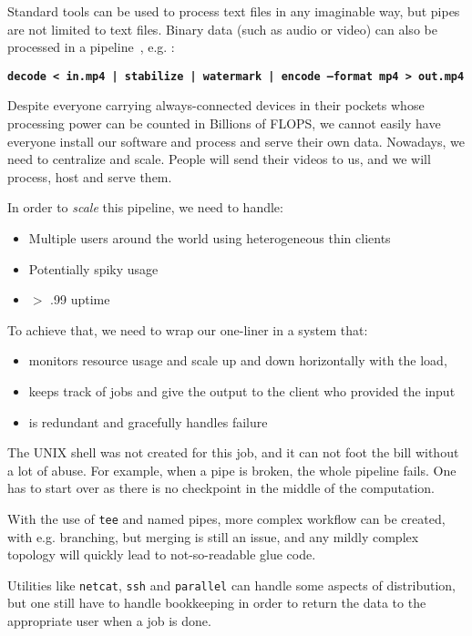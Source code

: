 \documentclass[letterpaper,twocolumn,10pt]{article}
\begin{document}
Standard tools can be used to process text files in any imaginable way, but pipes are not limited to text files. Binary data (such as audio or video) can also be processed in a pipeline~\cite{ffmpeg,audio}, e.g. :

{\bf \tt decode < in.mp4 | stabilize | watermark | encode --format mp4 > out.mp4 \\}

Despite everyone carrying always-connected devices in their pockets whose processing power can be counted in Billions of FLOPS, we cannot easily have everyone install our software and process and serve their own data. Nowadays, we need to centralize and scale. People will send their videos to us, and we will process, host and serve them.

In order to \emph{scale} this pipeline, we need to handle:
\begin{itemize}
\item Multiple users around the world using heterogeneous thin clients
\item Potentially spiky usage
\item $>$ .99 uptime
\end{itemize}

To achieve that, we need to wrap our one-liner in a system that:
\begin{itemize}
\item monitors resource usage and scale up and down horizontally with the load,
\item keeps track of jobs and give the output to the client who provided the input
\item is redundant and gracefully handles failure
\end{itemize}

The UNIX shell was not created for this job, and it can not foot the bill without a lot of abuse. For example, when a pipe is broken, the whole pipeline fails. One has to start over as there is no checkpoint in the middle of the computation.

With the use of {\tt tee} and named pipes, more complex workflow can be created, with e.g. branching, but merging is still an issue, and any mildly complex topology will quickly lead to not-so-readable glue code.

Utilities like {\tt netcat}, {\tt ssh} and {\tt parallel} can handle some aspects of distribution, but one still have to handle bookkeeping in order to return the data to the appropriate user when a job is done.
\end{document}
